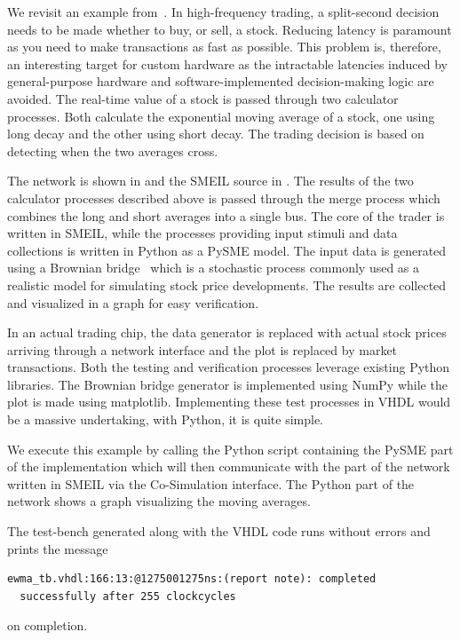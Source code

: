 We revisit an example from~\cite{asheim2016vhdl}. In high-frequency trading, a
split-second decision needs to be made whether to buy, or sell, a
stock. Reducing latency is paramount as you need to make transactions as fast as
possible. This problem is, therefore, an interesting target for custom hardware
as the intractable latencies induced by general-purpose hardware and
software-implemented decision-making logic are avoided. The real-time value of a
stock is passed through two calculator processes. Both calculate the exponential
moving average of a stock, one using long decay and the other using short
decay. The trading decision is based on detecting when the two averages
cross.~\cite{kablan2012use}

The network is shown in  and the SMEIL source in
. The results of the two calculator processes described above
is passed through the merge process which combines the long and short averages
into a single bus. The core of the trader is written in SMEIL, while the
processes providing input stimuli and data collections is written in Python as a
PySME model. The input data is generated using a Brownian
bridge~\cite{glasserman2003monte} which is a stochastic process commonly used as
a realistic model for simulating stock price developments. The results are
collected and visualized in a graph for easy verification.

In an actual trading chip, the data generator is replaced with actual stock
prices arriving through a network interface and the plot is replaced by market
transactions. Both the testing and verification processes leverage existing
Python libraries. The Brownian bridge generator is implemented using NumPy while
the plot is made using {\ttfamily matplotlib}. Implementing these test processes in VHDL
would be a massive undertaking, with Python, it is quite simple.

We execute this example by calling the Python script containing the PySME part
of the implementation which will then communicate with the part of the network
written in SMEIL via the Co-Simulation interface. The Python part of the network
shows a graph visualizing the moving averages.

The test-bench generated along with the VHDL code runs without errors and prints
the message
\begin{verbatim}
ewma_tb.vhdl:166:13:@1275001275ns:(report note): completed
  successfully after 255 clockcycles
\end{verbatim}
on completion.

